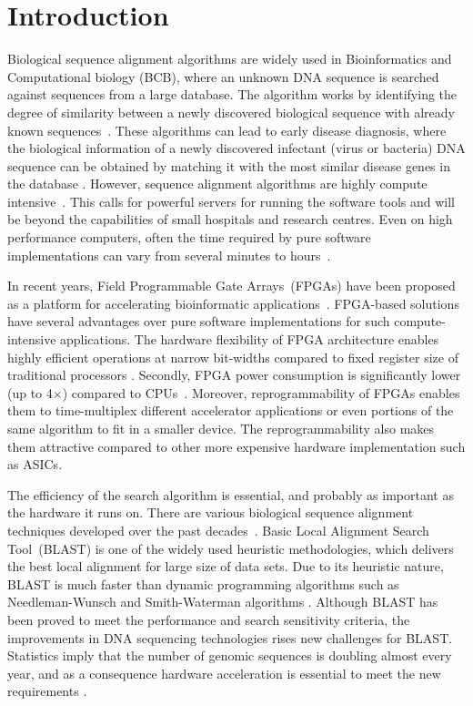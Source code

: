\section{Introduction}
\label{sec:introduction}

Biological sequence alignment algorithms are widely used in Bioinformatics and Computational biology (BCB), where an unknown DNA sequence is searched against sequences from a large database. 
The algorithm works by identifying the degree of similarity between a newly discovered biological sequence with already known sequences~\cite{kasap2008design}.
These algorithms can lead to early disease diagnosis, where the biological information of a newly discovered infectant (virus or bacteria) DNA sequence can be obtained by matching it with the most similar disease genes in the database \cite{guo2012systolic}. 
However, sequence alignment algorithms are highly compute intensive~\cite{datta2009}. 
This calls for powerful servers for running the software tools and will be beyond the capabilities of small hospitals and research centres.
Even on high performance computers, often the time required by pure software implementations can vary from several minutes to hours~\cite{masato2016}.  

In recent years, Field Programmable Gate Arrays~(FPGAs) have been proposed as a platform for accelerating bioinformatic applications~\cite{kasap2008design}. 
FPGA-based solutions have several advantages over pure software implementations for such compute-intensive applications.
The hardware flexibility of FPGA architecture enables highly efficient operations at narrow bit-widths compared to fixed register size of traditional processors \cite{cug2007}. 
Secondly, FPGA power consumption is significantly lower (up to 4$\times$) compared to CPUs~\cite{cug2007}. 
Moreover, reprogrammability of FPGAs enables them to time-multiplex different accelerator applications or even portions of the same algorithm to fit in a smaller device. 
The reprogrammability also makes them attractive compared to other more expensive hardware implementation such as ASICs. 

The efficiency of the search algorithm is essential, and probably as important as the hardware it runs on. 
There are various biological sequence alignment techniques developed over the past decades~\cite{mohd2013}. 
Basic Local Alignment Search Tool~(BLAST) is one of the widely used heuristic methodologies, which delivers the best local alignment for large size of data sets. 
Due to its heuristic nature, BLAST is much faster than dynamic programming algorithms such as Needleman-Wunsch and Smith-Waterman algorithms \cite{wien2011blastp}. 
Although BLAST has been proved to meet the performance and search sensitivity criteria, the improvements in DNA sequencing technologies rises new challenges for BLAST. 
Statistics imply that the number of genomic sequences is doubling almost every year, and as a consequence hardware acceleration is essential to meet the new requirements \cite{wien2011blastp}. 

